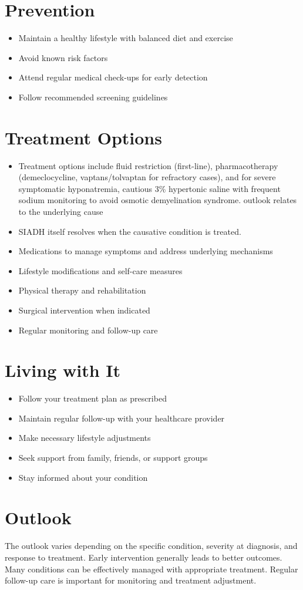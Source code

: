 \section{Prevention}
\begin{itemize}[noitemsep]
  \item Maintain a healthy lifestyle with balanced diet and exercise
  \item Avoid known risk factors
  \item Attend regular medical check-ups for early detection
  \item Follow recommended screening guidelines
\end{itemize}
\section{Treatment Options}
\begin{itemize}[noitemsep]
  \item Treatment options include fluid restriction (first-line), pharmacotherapy (demeclocycline, vaptans/tolvaptan for refractory cases), and for severe symptomatic hyponatremia, cautious 3\% hypertonic saline with frequent sodium monitoring to avoid osmotic demyelination syndrome. outlook relates to the underlying cause
  \item SIADH itself resolves when the causative condition is treated.
  \item Medications to manage symptoms and address underlying mechanisms
  \item Lifestyle modifications and self-care measures
  \item Physical therapy and rehabilitation
  \item Surgical intervention when indicated
  \item Regular monitoring and follow-up care
\end{itemize}
\section{Living with It}
\begin{itemize}[noitemsep]
  \item Follow your treatment plan as prescribed
  \item Maintain regular follow-up with your healthcare provider
  \item Make necessary lifestyle adjustments
  \item Seek support from family, friends, or support groups
  \item Stay informed about your condition
\end{itemize}
\section{Outlook}
The outlook varies depending on the specific condition, severity at diagnosis, and response to treatment. Early intervention generally leads to better outcomes. Many conditions can be effectively managed with appropriate treatment. Regular follow-up care is important for monitoring and treatment adjustment.

